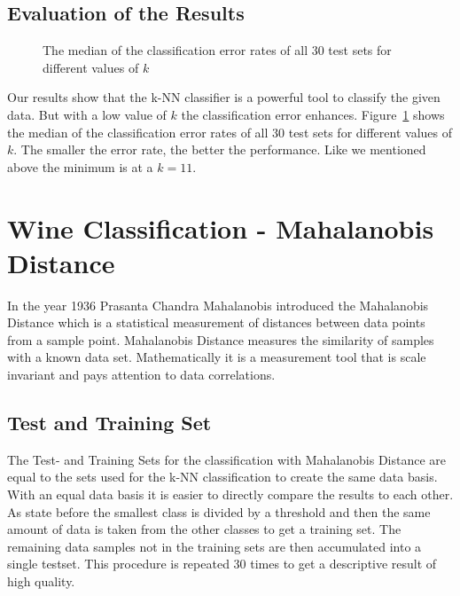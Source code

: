 \documentclass[subfigure,epsfig,fleqn,amssmb,float,caption,ausarbeitung]{scrartcl}
\begin{document}
\subsection{Evaluation of the Results}
\label{sec:kNNResults}

\begin{figure}
	\centering
	\setlength\figureheight{6cm} 
	\setlength\figurewidth{7cm}
	
	\caption{The median of the classification error rates of all 30 test sets for different values of $k$}
	\label{fig:ks}
\end{figure}

Our results show that the k-NN classifier is a powerful tool to classify the 
given data. But with a low value of $k$ the classification error enhances. Figure~\ref{fig:ks} shows the median of the classification error rates of all 30 test sets for different values of $k$. The smaller the error rate, the better the performance. Like we mentioned above the minimum is at a $k=11$.


\section{Wine Classification - Mahalanobis Distance}
\label{sec:Mahalanobis}

In the year 1936 Prasanta Chandra Mahalanobis introduced the Mahalanobis Distance which is a statistical measurement of distances between data points from a sample point. Mahalanobis Distance measures the similarity of samples with a known data set. Mathematically it is a measurement tool that is scale invariant and pays attention to data correlations.


\subsection{Test and Training Set}
\label{sec:MahalanobisTestSet}

The Test- and Training Sets for the classification with Mahalanobis Distance are equal to the sets used for the k-NN classification to create the same data basis. With an equal data basis it is easier to directly compare the results to each other. As state before the smallest class is divided by a threshold and then the same amount of data is taken from the other classes to get a training set. The remaining data samples not in the training sets are then accumulated into a single testset. This procedure is repeated 30 times to get a descriptive result of high quality. 
\end{document}
